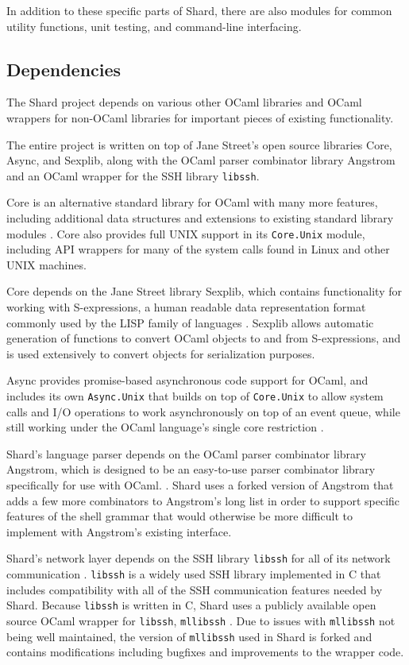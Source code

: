 \documentclass[twoside]{report}
\newcommand{\todoi}[1]{\todo[inline, color=blue!20]{TODO: {#1}}}
\begin{document}

In addition to these specific parts of Shard, there are also modules for common utility functions, unit testing, and command-line interfacing.

\subsection{Dependencies}
The Shard project depends on various other OCaml libraries and OCaml wrappers for non-OCaml libraries for important pieces of existing functionality.

The entire project is written on top of Jane Street's open source libraries Core, Async, and Sexplib, along with the OCaml parser combinator library Angstrom and an OCaml wrapper for the SSH library \texttt{libssh}.

Core is an alternative standard library for OCaml with many more features, including additional data structures and extensions to existing standard library modules \cite{ocamlcore}.
Core also provides full UNIX support in its \texttt{Core.Unix} module, including API wrappers for many of the system calls found in Linux and other UNIX machines.

Core depends on the Jane Street library Sexplib, which contains functionality for working with S-expressions, a human readable data representation format commonly used by the LISP family of languages \cite{mccarthy1960recursive}. Sexplib allows automatic generation of functions to convert OCaml objects to and from S-expressions, and is used extensively to convert objects for serialization purposes.

Async provides promise-based asynchronous code support for OCaml, and includes its own \texttt{Async.Unix} that builds on top of \texttt{Core.Unix} to allow system calls and I/O operations to work asynchronously on top of an event queue, while still working under the OCaml language's single core restriction \cite{ocamlasync}.

Shard's language parser depends on the OCaml parser combinator library Angstrom, which is designed to be an easy-to-use parser combinator library specifically for use with OCaml. \cite{ocamlangstrom}.
Shard uses a forked version of Angstrom that adds a few more combinators to Angstrom's long list in order to support specific features of the shell grammar that would otherwise be more difficult to implement with Angstrom's existing interface.

Shard's network layer depends on the SSH library \texttt{libssh} for all of its network communication \cite{libssh}.
\texttt{libssh} is a widely used SSH library implemented in C that includes compatibility with all of the SSH communication features needed by Shard.
Because \texttt{libssh} is written in C, Shard uses a publicly available open source OCaml wrapper for \texttt{libssh}, \texttt{mllibssh} \cite{mllibssh}.
Due to issues with \texttt{mllibssh} not being well maintained, the version of \texttt{mllibssh} used in Shard is forked and contains modifications including bugfixes and improvements to the wrapper code.
\end{document}
